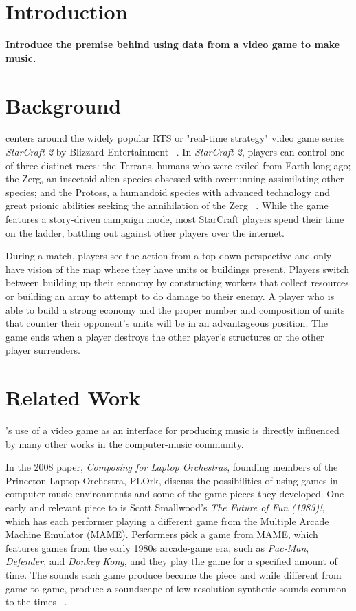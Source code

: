 \documentclass{nime-document-class}
\begin{document}
\section{Introduction}
{\bf Introduce the premise behind using data from a video game to make music.}

\section{Background}
\projectName{} centers around the widely popular RTS or "real-time strategy" video game series {\em StarCraft 2} by Blizzard Entertainment ~\cite{Blizzard:2013:Online}.
In {\em StarCraft 2}, players can control one of three distinct races: the Terrans, humans who were exiled from Earth long ago; the Zerg, an insectoid alien species obsessed with overrunning assimilating other species; and the Protoss, a humandoid species with advanced technology and great psionic abilities seeking the annihilation of the Zerg ~\cite{BlizzardRaces:2013:Online}.
While the game features a story-driven campaign mode, most StarCraft players spend their time on the ladder, battling out against other players over the internet. 

During a match, players see the action from a top-down perspective and only have vision of the map where they have units or buildings present.
Players switch between building up their economy by constructing workers that collect resources or building an army to attempt to do damage to their enemy.
A player who is able to build a strong economy and the proper number and composition of units that counter their opponent's units will be in an advantageous position.
The game ends when a player destroys the other player's structures or the other player surrenders.

\section{Related Work}
\projectName{}'s use of a video game as an interface for producing music is directly influenced by many other works in the computer-music community.

In the 2008 paper, {\em Composing for Laptop Orchestras}, founding members of the Princeton Laptop Orchestra, PLOrk, discuss the possibilities of using games in computer music environments and some of the game pieces they developed.
One early and relevant piece to \projectName{} is Scott Smallwood's {\em The Future of Fun (1983)!}, which has each performer playing a different game from the Multiple Arcade Machine Emulator (MAME).
Performers pick a game from MAME, which features games from the early 1980s arcade-game era, such as {\em Pac-Man}, {\em Defender}, and {\em Donkey Kong}, and they play the game for a specified amount of time.
The sounds each game produce become the piece and while different from game to game, produce a soundscape of low-resolution synthetic sounds common to the times ~\cite{ComposingForLaptopOrchestra:Article}.
\end{document}
